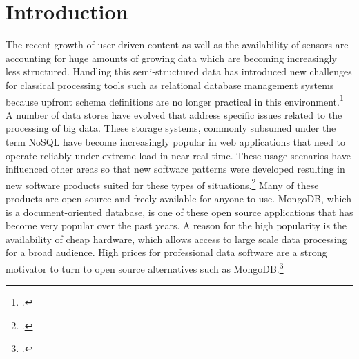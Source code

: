 \newpage

\listoftables
{}
\newpage


\listoffigures
{}
\newpage

\listoflistings
{}
\newpage

\renewcommand{\thepage}{\arabic{page}}

\setcounter{page}{1} 


\section{Introduction}
\label{sec:introduction}

The recent growth of user-driven content as well as the availability of sensors
are accounting for huge amounts of growing data which are becoming increasingly
less structured. Handling this semi-structured data has introduced new
challenges for classical processing tools such as relational database management
systems because upfront schema definitions are no longer practical in this
environment.\footcite[Cf.][XVII]{Tiwari_2011} A number of data stores have
evolved that address specific issues related to the processing of big data.
These storage systems, commonly subsumed under the term NoSQL have become
increasingly popular in web applications that need to operate reliably under
extreme load in near real-time.
These usage scenarios have influenced other areas so that new
software patterns were developed resulting in new software products suited
for these types of situations.\footcite[Cf.][VII]{Warden_2011} Many of these products are
open source and freely available for anyone to use.
MongoDB, which is a document-oriented database, is one of these open source
applications that has become very popular over the past years.
A reason for the high popularity is the availability of cheap hardware, which
allows access to large scale data processing for a broad audience.
High prices for professional data software are a strong motivator to turn to
open source alternatives such as MongoDB.\footcite[Cf.][VII]{Warden_2011}


